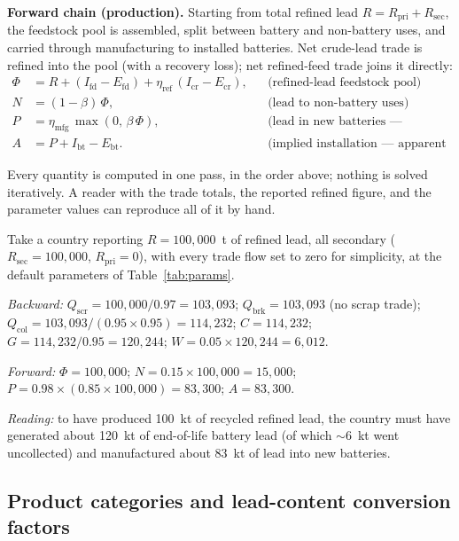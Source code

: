\documentclass[11pt,a4paper]{article}
\begin{document}
\textbf{Forward chain (production).} Starting from total refined lead
$R = R_{\mathrm{pri}} + R_{\mathrm{sec}}$, the feedstock pool is assembled, split
between battery and non-battery uses, and carried through manufacturing to installed
batteries. Net crude-lead trade is refined into the pool (with a recovery loss); net
refined-feed trade joins it directly:
\begin{align}
\Phi &= R + (I_{\mathrm{fd}} - E_{\mathrm{fd}})
        + \eta_{\mathrm{ref}}\,(I_{\mathrm{cr}} - E_{\mathrm{cr}}),
  & &\text{(refined-lead feedstock pool)}\label{eq:f1}\\
N &= (1-\beta)\,\Phi,
  & &\text{(lead to non-battery uses)}\label{eq:f2}\\
P &= \eta_{\mathrm{mfg}}\,\max(0,\,\beta\,\Phi),
  & &\text{(lead in new batteries --- manufacturing)}\label{eq:f4}\\
A &= P + I_{\mathrm{bt}} - E_{\mathrm{bt}}.
  & &\text{(implied installation --- apparent consumption)}\label{eq:f5}
\end{align}

Every quantity is computed in one pass, in the order above; nothing is solved
iteratively. A reader with the trade totals, the reported refined figure, and the
parameter values can reproduce all of it by hand.

\begin{worked}
\small
Take a country reporting $R = 100{,}000$~t of refined lead, all secondary
($R_{\mathrm{sec}} = 100{,}000$, $R_{\mathrm{pri}}=0$), with every trade flow set to
zero for simplicity, at the default parameters of Table~\ref{tab:params}.

\emph{Backward:}
$Q_{\mathrm{scr}} = 100{,}000/0.97 = 103{,}093$;
$Q_{\mathrm{brk}} = 103{,}093$ (no scrap trade);
$Q_{\mathrm{col}} = 103{,}093/(0.95\times0.95) = 114{,}232$;
$C = 114{,}232$;
$G = 114{,}232/0.95 = 120{,}244$;
$W = 0.05\times120{,}244 = 6{,}012$.

\emph{Forward:}
$\Phi = 100{,}000$;
$N = 0.15\times100{,}000 = 15{,}000$;
$P = 0.98\times(0.85\times100{,}000) = 83{,}300$;
$A = 83{,}300$.

\emph{Reading:} to have produced 100~kt of recycled refined lead, the country must have
generated about 120~kt of end-of-life battery lead (of which $\sim$6~kt went
uncollected) and manufactured about 83~kt of lead into new batteries.
\end{worked}

\subsection{Product categories and lead-content conversion factors}
\end{document}
